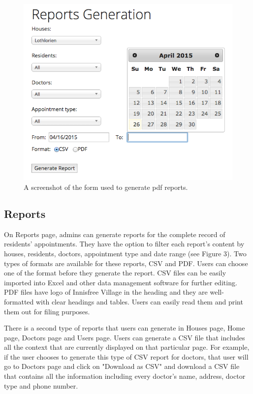 \documentclass{sig-alternate}
\begin{document}
\begin{figure}
\includegraphics[scale=0.4]{ReportGeneration}
\caption{A screenshot of the form used to generate pdf reports.}
\end{figure}

\subsection{Reports}
On Reports page, admins can generate reports for the complete record of residents' appointments. They have the option to filter each report's content by houses, residents, doctors, appointment type and date range (see Figure 3). Two types of formats are available for these reports, CSV and PDF. Users can choose one of the format before they generate the report. CSV files can be easily imported into Excel and other data management software for further editing. PDF files have logo of Innisfree Village in the heading and they are well-formatted with clear headings and tables. Users can easily read them and print them out for filing purposes. 

There is a second type of reports that users can generate in Houses page, Home page, Doctors page and Users page. Users can generate a CSV file that includes all the context that are currently displayed on that particular page. For example, if the user chooses to generate this type of CSV report for doctors, that user will go to Doctors page and click on "Download as CSV" and download a CSV file that contains all the information including every doctor's name, address, doctor type and phone number. 
\end{document}
